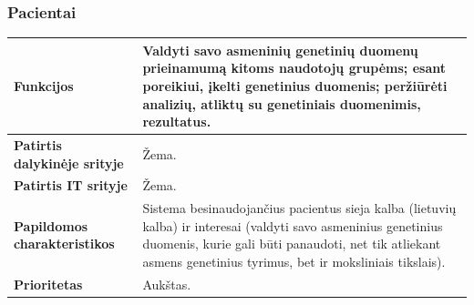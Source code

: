 \documentclass[12pt]{article}
\begin{document}
\subsubsection*{Pacientai}
\label{sec:N1}
\begin{table}[htb!]
    \captionsetup{justification=centering}
    \vskip -10pt
    \begin{tabular}{|m{4cm}|m{12cm}|}
        \hline
        \raggedleft \textbf{\cellcolor{deepchampagne}Funkcijos} &
        Valdyti savo asmeninių genetinių duomenų prieinamumą kitoms naudotojų
        grupėms; esant poreikiui, įkelti genetinius duomenis; peržiūrėti
        analizių, atliktų su genetiniais duomenimis, rezultatus. \\
        \hline
        \raggedleft \textbf{\cellcolor{deepchampagne}Patirtis dalykinėje
        srityje} & Žema. \\
        \hline
        \raggedleft \textbf{\cellcolor{deepchampagne}Patirtis IT srityje} &
        Žema. \\
        \hline
        \raggedleft \textbf{\cellcolor{deepchampagne}Papildomos
        charakteristikos} &
        Sistema besinaudojančius
        pacientus sieja kalba (lietuvių kalba) ir interesai (valdyti savo
        asmeninius genetinius duomenis, kurie gali būti panaudoti, net tik
        atliekant asmens genetinius tyrimus, bet ir moksliniais tikslais). \\
        \hline
        \raggedleft \textbf{\cellcolor{deepchampagne}Prioritetas} & Aukštas. \\
        \hline
    \end{tabular}
\end{table}

\newpage
\end{document}
